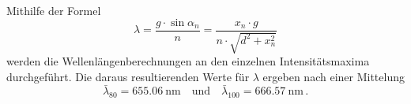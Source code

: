 Mithilfe der Formel
\begin{equation}
    \lambda=\frac{g \cdot \sin \alpha_n}{n} = \frac{x_n \cdot g}{n \cdot \sqrt{d^2+x_n^2}}
\end{equation} 
werden die Wellenlängenberechnungen an den einzelnen Intensitätsmaxima durchgeführt. 
Die daraus resultierenden Werte für $\lambda$ ergeben nach einer Mittelung
\begin{equation*}
    \bar{\lambda}_{80} = \qty{655.06}{\nano\meter} \quad \text{und} \quad
    \bar{\lambda}_{100} = \qty{666.57}{\nano\meter} \, .
\end{equation*}
